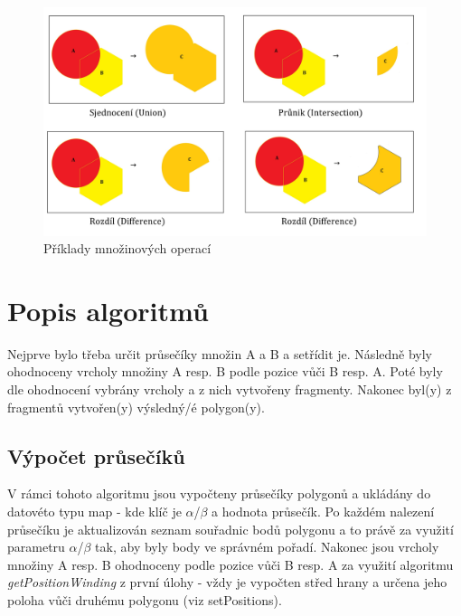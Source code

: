 \documentclass[a4paper, 12pt]{article}
\begin{document}
\begin{figure}[h]
	\centering
	\includegraphics[width=18cm]{BO.jpg}
	\caption{Příklady množinových operací}
\end{figure}


\clearpage
\section{Popis algoritmů}

Nejprve bylo třeba určit průsečíky množin A a B a setřídit je. Následně byly ohodnoceny vrcholy množiny A resp. B podle pozice vůči B resp. A. Poté byly dle ohodnocení vybrány vrcholy a z nich vytvořeny fragmenty. Nakonec byl(y) z fragmentů vytvořen(y) výsledný/é polygon(y).

\subsection{Výpočet průsečíků}
V rámci tohoto algoritmu jsou vypočteny průsečíky polygonů a ukládány do datovéto typu map - kde klíč je $\alpha$/$\beta$ a hodnota průsečík. Po každém nalezení průsečíku je aktualizován seznam souřadnic bodů polygonu a to právě za využití parametru $\alpha$/$\beta$ tak, aby byly body ve správném pořadí. Nakonec jsou vrcholy množiny A resp. B ohodnoceny podle pozice vůči B resp. A za využití algoritmu \textit{getPositionWinding} z první úlohy - vždy je vypočten střed hrany a určena jeho poloha vůči druhému polygonu (viz setPositions).
\end{document}
